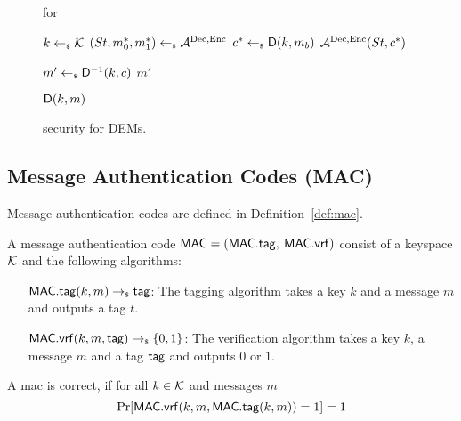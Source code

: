   \begin{figure}[!tbh]
    \begin{gamebox}{\indrcca for \dem}
      \begin{minipage}[t]{.5\linewidth}
        \begin{algorithmic}
          \State $k\gets_{\scriptscriptstyle\$} \mathcal{K}$
          \State $(St, m_0^*, m_1^*) \gets_{\scriptscriptstyle\$} \mathcal{A}_{\relax}^{\text{Dec},\text{Enc}}$
          \State $c^* \gets_{\scriptscriptstyle\$} {\mathsf{D}}(k, m_b)$
          \State \Return $\mathcal{A}_{\relax}^{\text{Dec},\text{Enc}}(St, c^*)$
        \end{algorithmic}
      \end{minipage}
    \hfill
      \begin{minipage}[t]{.48\linewidth}
        \begin{algorithmic}
          \State $m' \gets_{\scriptscriptstyle\$} {\mathsf{D}}^{-1}(k, c)$
          \State \Return {}
          \Else
          \State \Return $m'$
          \EndIf
        \end{algorithmic}
        \medskip
        \begin{algorithmic}
          \State \Return ${\mathsf{D}}(k, m)$
        \end{algorithmic}
      \end{minipage}
    \end{gamebox}
    \caption{\indrcca security for DEMs.}
    \label{fig:dem_rcca}
  \end{figure}

\subsection{Message Authentication Codes (MAC)}
Message authentication codes are defined in Definition~\ref{def:mac}.

\begin{definition}\label{def:mac}
  A message authentication code ${\mathsf{MAC}} = ({\mathsf{MAC}}.{\mathsf{tag}},$ $ {\mathsf{MAC}}.{\mathsf{vrf}})$ consist of a keyspace $\mathcal{K}$ and the following
  algorithms:
  \begin{itemize}[align=left]
    \item[${\mathsf{MAC}}.{\mathsf{tag}}(k, m)\rightarrow_{\scriptscriptstyle\$} {\mathsf{tag}}$:] The tagging algorithm takes a key $k$ and a message $m$ and outputs
      a tag $t$.
    \item[${\mathsf{MAC}}.{\mathsf{vrf}}(k, m, {\mathsf{tag}})\rightarrow_{\scriptscriptstyle\$}\{0,1\}$:] The verification algorithm takes a key $k$, a message $m$ and
      a tag ${\mathsf{tag}}$ and outputs $0$ or $1$.
    \end{itemize}
    A mac \mac is correct, if for all $k\in\mathcal{K}$ and messages $m$
    \[
      \text{Pr}[{\mathsf{MAC}}.{\mathsf{vrf}}(k, m, {\mathsf{MAC}}.{\mathsf{tag}}(k,m)) = 1] = 1
    \]
\end{definition}

